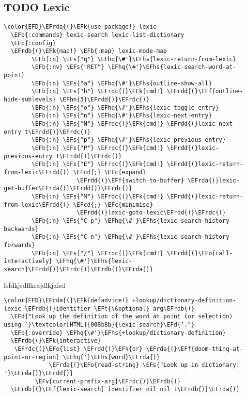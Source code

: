 \documentclass{article}
\newcommand{\EFc}[1]{\textcolor{EFc}{#1}} %
\newcommand{\EFcd}[1]{\textcolor{EFcd}{#1}} %
\newcommand{\EFs}[1]{\textcolor{EFs}{#1}} %
\newcommand{\EFd}[1]{\textcolor{EFd}{#1}} %
\newcommand{\EFk}[1]{\textcolor{EFk}{#1}} %
\newcommand{\EFb}[1]{\textcolor{EFb}{#1}} %
\newcommand{\EFf}[1]{\textcolor{EFf}{#1}} %
\newcommand{\EFv}[1]{\textcolor{EFv}{#1}} %
\newcommand{\EFt}[1]{\textcolor{EFt}{#1}} %
\newcommand{\EFo}[1]{\textcolor{EFo}{#1}} %
\newcommand{\EFhn}[1]{\textcolor{EFhn}{\textbf{#1}}} %
\newcommand{\EFhq}[1]{#1} %
\newcommand{\EFhs}[1]{\textcolor{EFhs}{#1}} %
\newcommand{\EFrda}[1]{\textcolor{EFrda}{#1}} %
\newcommand{\EFrdb}[1]{\textcolor{EFrdb}{#1}} %
\newcommand{\EFrdc}[1]{\textcolor{EFrdc}{#1}} %
\newcommand{\EFrdd}[1]{\textcolor{EFrdd}{#1}} %
\begin{document}
\subsection{{\bfseries\sffamily TODO} Lexic}
\label{sec:org3b4fd98}
\begin{Code}
\begin{Verbatim}
\color{EFD}\EFrda{(}\EFk{use-package!} lexic
  \EFb{:commands} lexic-search lexic-list-dictionary
  \EFb{:config}
  \EFrdb{(}\EFk{map!} \EFb{:map} lexic-mode-map
        \EFb{:n} \EFs{"q"} \EFhq{\#'}\EFhs{lexic-return-from-lexic}
        \EFb{:nv} \EFs{"RET"} \EFhq{\#'}\EFhs{lexic-search-word-at-point}
        \EFb{:n} \EFs{"a"} \EFhq{\#'}\EFhs{outline-show-all}
        \EFb{:n} \EFs{"h"} \EFrdc{(}\EFk{cmd!} \EFrdd{(}\EFf{outline-hide-sublevels} \EFhn{3}\EFrdd{)}\EFrdc{)}
        \EFb{:n} \EFs{"o"} \EFhq{\#'}\EFhs{lexic-toggle-entry}
        \EFb{:n} \EFs{"n"} \EFhq{\#'}\EFhs{lexic-next-entry}
        \EFb{:n} \EFs{"N"} \EFrdc{(}\EFk{cmd!} \EFrdd{(}lexic-next-entry t\EFrdd{)}\EFrdc{)}
        \EFb{:n} \EFs{"p"} \EFhq{\#'}\EFhs{lexic-previous-entry}
        \EFb{:n} \EFs{"P"} \EFrdc{(}\EFk{cmd!} \EFrdd{(}lexic-previous-entry t\EFrdd{)}\EFrdc{)}
        \EFb{:n} \EFs{"E"} \EFrdc{(}\EFk{cmd!} \EFrdd{(}lexic-return-from-lexic\EFrdd{)} \EFcd{;} \EFc{expand}
                     \EFrdd{(}\EFf{switch-to-buffer} \EFrda{(}lexic-get-buffer\EFrda{)}\EFrdd{)}\EFrdc{)}
        \EFb{:n} \EFs{"M"} \EFrdc{(}\EFk{cmd!} \EFrdd{(}lexic-return-from-lexic\EFrdd{)} \EFcd{;} \EFc{minimise}
                     \EFrdd{(}lexic-goto-lexic\EFrdd{)}\EFrdc{)}
        \EFb{:n} \EFs{"C-p"} \EFhq{\#'}\EFhs{lexic-search-history-backwards}
        \EFb{:n} \EFs{"C-n"} \EFhq{\#'}\EFhs{lexic-search-history-forwards}
        \EFb{:n} \EFs{"/"} \EFrdc{(}\EFk{cmd!} \EFrdd{(}\EFo{call-interactively} \EFhq{\#'}\EFhs{lexic-search}\EFrdd{)}\EFrdc{)}\EFrdb{)}\EFrda{)}
\end{Verbatim}
\end{Code}

lsfdkjsdflksajdlkjafsd
\begin{Code}
\begin{Verbatim}
\color{EFD}\EFrda{(}\EFk{defadvice!} +lookup/dictionary-definition-lexic \EFrdb{(}identifier \EFt{\&optional} arg\EFrdb{)}
  \EFd{"Look up the definition of the word at point (or selection) using `}\textcolor[HTML]{008b8b}{lexic-search}\EFd{'."}
  \EFb{:override} \EFhq{\#'}\EFhs{+lookup/dictionary-definition}
  \EFrdb{(}\EFk{interactive}
   \EFrdc{(}\EFo{list} \EFrdd{(}\EFk{or} \EFrda{(}\EFf{doom-thing-at-point-or-region} \EFhq{'}\EFhs{word}\EFrda{)}
             \EFrda{(}\EFo{read-string} \EFs{"Look up in dictionary: "}\EFrda{)}\EFrdd{)}
         \EFv{current-prefix-arg}\EFrdc{)}\EFrdb{)}
  \EFrdb{(}\EFf{lexic-search} identifier nil nil t\EFrdb{)}\EFrda{)}
\end{Verbatim}
\end{Code}
\end{document}
